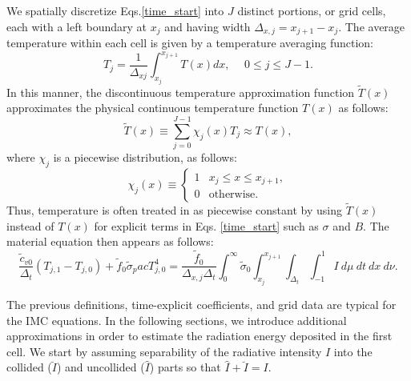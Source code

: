 We spatially discretize Eqs.\hspace{3pt}\eqref{time_start}
into $J$ distinct
portions, or grid cells, each with a left boundary at $x_j$ and having width
$\Delta_{x,j}=x_{j+1}-x_j$.  The average temperature within each cell is given
by a
temperature averaging function:
\[T_j=\frac{1}{\Delta_{xj}}\int_{x_j}^{x_{j+1}}T(x)dx, \hspace{15pt}
  0\leq j\leq J-1. \]
In this manner, the discontinuous temperature approximation function $\tilde
T(x)$ approximates the physical continuous temperature function $T(x)$ as
follows:
\[\tilde T(x)\equiv\sum_{j=0}^{J-1}\chi_j(x)T_j\approx T(x),\]
where $\chi_j$ is a piecewise distribution, as follows:
\begin{equation}
\chi_j(x)\equiv
\begin{cases}
1 & x_j\leq x\leq x_{j+1}, \\
0 & \mbox{otherwise}.
\end{cases}
\end{equation}
Thus, temperature is often treated in as piecewise constant by
using $\tilde T(x)$ instead of $T(x)$ for explicit terms in Eqs.
\eqref{time_start} such as $\sigma$ and $B$.  The material equation then
appears as follows:
\begin{equation}
\frac{\tilde c_{v0}}{\Delta_t}(T_{j,1}-T_{j,0}) + 
  \tilde f_0 \tilde \sigma_p acT^4_{j,0} = 
  \frac{\tilde f_0}{\Delta_{x,j}
  \Delta_t}\int_0^\infty\tilde\sigma_0\int_{x_j}^{x_{j+1}}
\int_{\Delta_t}\int_{-1}^1 I \ d\mu \ dt\  dx\  d\nu.
\end{equation}

The previous definitions, time-explicit coefficients, and grid data are typical
for the IMC equations.  In the following sections, we introduce additional
approximations in order to estimate the radiation energy deposited in the first
cell.
We start by assuming separability of the radiative
intensity $I$ into the collided ($\breve I$) and uncollided ($\hat I$)
parts so that $\hat I + \breve I=I$.

